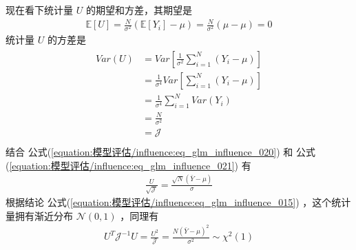 \documentclass[letterpaper,10pt,english]{sphinxmanual}
\begin{document}
现在看下统计量 \(U\) 的期望和方差，其期望是
\begin{equation}\label{equation:模型评估/influence:模型评估/influence:12}
\begin{split}\mathbb{E}[U] = \frac{N}{\sigma^2} ( \mathbb{E}[Y_i] - \mu)
= \frac{N}{\sigma^2} ( \mu - \mu) =0\end{split}
\end{equation}
统计量 \(U\) 的方差是
\begin{align}\label{equation:模型评估/influence:eq_glm_influence_021}\!\begin{aligned}
Var(U)
&= Var \left[   \frac{1}{\sigma^2} \sum_{i=1}^N (Y_i -\mu)  \right]\\
&=\frac{1}{\sigma^4}  Var \left[  \sum_{i=1}^N (Y_i -\mu)  \right]\\
&= \frac{1}{\sigma^4}  \sum_{i=1}^N Var(Y_i)\\
&= \frac{N}{\sigma^2}\\
&= \mathcal{J}\\
\end{aligned}\end{align}
结合 公式(\ref{equation:模型评估/influence:eq_glm_influence_020}) 和 公式(\ref{equation:模型评估/influence:eq_glm_influence_021}) 有
\begin{equation}\label{equation:模型评估/influence:模型评估/influence:13}
\begin{split}\frac{U}{\sqrt{\mathcal{J}}} = \frac{\sqrt{N}(\bar{Y} - \mu)}{\sigma}\end{split}
\end{equation}
根据结论 公式(\ref{equation:模型评估/influence:eq_glm_influence_015}) ，这个统计量拥有渐近分布 \(\mathcal{N}(0,1)\)
，同理有
\begin{equation}\label{equation:模型评估/influence:模型评估/influence:14}
\begin{split}U^T\mathcal{J}^{-1}U = \frac{U^2}{\mathcal{J}}
= \frac{N(\bar{Y} - \mu)^2}{\sigma^2}
\sim \chi^2(1)\end{split}
\end{equation}
\end{document}
